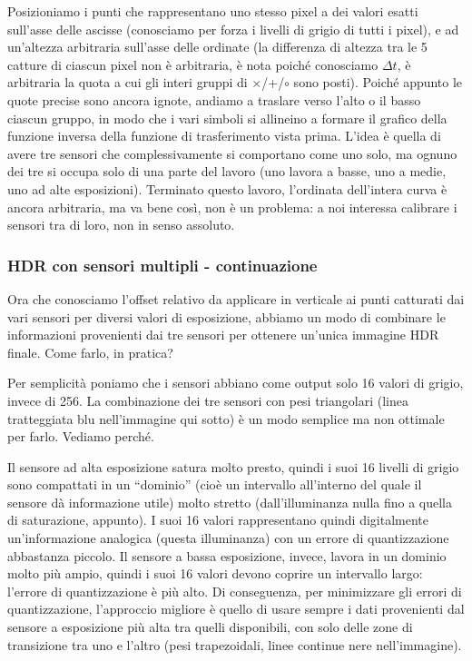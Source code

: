 \documentclass[a4paper,11pt]{article}
\begin{document}
Posizioniamo i punti che rappresentano uno stesso pixel a dei valori esatti sull'asse delle ascisse (conosciamo per forza i livelli di grigio di tutti i pixel),
e ad un'altezza arbitraria sull'asse delle ordinate (la differenza di altezza tra le 5 catture di ciascun pixel non è arbitraria, è nota poiché conosciamo $\Delta t$, è arbitraria
la quota a cui gli interi gruppi di $\times$/+/$\circ$ sono posti).
\newline
Poiché appunto le quote precise sono ancora ignote, andiamo a traslare verso l'alto o il basso ciascun gruppo, in modo che i vari simboli si allineino a formare il grafico della funzione
inversa della funzione di trasferimento vista prima. L'idea è quella di avere tre sensori che complessivamente si comportano come uno solo, ma ognuno dei tre si occupa solo
di una parte del lavoro (uno lavora a basse, uno a medie, uno ad alte esposizioni).
\newline
Terminato questo lavoro, l'ordinata dell'intera curva è ancora arbitraria, ma va bene così, non è un problema: a noi interessa calibrare i sensori tra di loro, non in senso assoluto.

\subsubsection{HDR con sensori multipli - continuazione}
Ora che conosciamo l'offset relativo da applicare in verticale ai punti catturati dai vari sensori
per diversi valori di esposizione, abbiamo un modo di combinare le informazioni provenienti dai tre sensori per ottenere un'unica immagine HDR finale. Come farlo, in pratica?
\par
Per semplicità poniamo che i sensori abbiano come output solo 16
valori di grigio, invece di 256.
La combinazione dei tre sensori con pesi triangolari (linea tratteggiata blu nell'immagine qui sotto) è un modo semplice ma non ottimale per farlo. Vediamo perché.
\par
Il sensore ad alta esposizione satura molto presto, quindi i suoi 16 livelli di grigio sono compattati in un ``dominio''
(cioè un intervallo all'interno del quale il sensore dà informazione utile) molto stretto
(dall'illuminanza nulla fino a quella di saturazione, appunto). I suoi 16 valori rappresentano quindi digitalmente
un'informazione analogica (questa illuminanza) con un errore di quantizzazione abbastanza piccolo.
Il sensore a bassa esposizione, invece, lavora in un dominio molto più ampio, quindi i suoi 16 valori
devono coprire un intervallo largo: l'errore di quantizzazione è più alto. Di conseguenza, per minimizzare gli
errori di quantizzazione, l'approccio migliore è quello di usare sempre i dati provenienti dal sensore
a esposizione più alta tra quelli disponibili, con solo delle zone di transizione tra uno e l'altro (pesi trapezoidali, linee continue nere nell'immagine).
\end{document}
